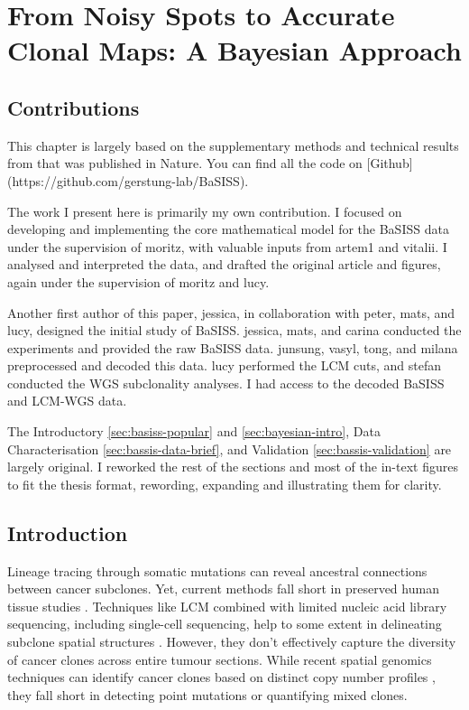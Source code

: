 \chapter{From Noisy Spots to Accurate Clonal Maps: A Bayesian Approach}

\section*{Contributions}
This chapter is largely based on the supplementary methods and technical results from \textcite{Lomakin2022-rw} that was published in Nature. You can find all the code on [Github](https://github.com/gerstung-lab/BaSISS).

The work I present here is primarily my own contribution. I focused on developing and implementing the core mathematical model for the \acs{BaSISS} data under the supervision of \ac{moritz}, with valuable inputs from \ac{artem1} and \ac{vitalii}. I analysed and interpreted the data, and drafted the original article and figures, again under the supervision of \ac{moritz} and \ac{lucy}.

Another first author of this paper, \ac{jessica}, in collaboration with \ac{peter}, \ac{mats}, and \ac{lucy}, designed the initial study of \acs{BaSISS}. \ac{jessica}, \ac{mats}, and \ac{carina} conducted the experiments and provided the raw \acs{BaSISS} data. \ac{junsung}, \ac{vasyl}, \ac{tong}, and \ac{milana} preprocessed and decoded this data. \ac{lucy} performed the \acs{LCM} cuts, and \ac{stefan} conducted the \acs{WGS} subclonality analyses. I had access to the decoded \acs{BaSISS} and \acs{LCM}-\acs{WGS} data.

The Introductory \cref{sec:basiss-popular} and \cref{sec:bayesian-intro}, Data Characterisation \cref{sec:bassis-data-brief}, and Validation \cref{sec:bassis-validation} are largely original. I reworked the rest of the sections and most of the in-text figures to fit the thesis format, rewording, expanding and illustrating them for clarity.

\section{Introduction}
\label{sec:basiss-intro}
Lineage tracing through somatic mutations can reveal ancestral connections between cancer subclones. Yet, current methods fall short in preserved human tissue studies \parencite{Yates2015-eg,Jamal-Hanjani2017-ed,Jones2008-tg,Shah2009-lx,Casasent2018-gx,Tarabichi2021-xx}. Techniques like \acf{LCM} combined with limited nucleic acid library sequencing, including single-cell sequencing, help to some extent in delineating subclone spatial structures \parencite{Shen2000-xj,Casasent2018-gx}. However, they don't effectively capture the diversity of cancer clones across entire tumour sections. While recent spatial genomics techniques can identify cancer clones based on distinct copy number profiles \parencite{Zhao2022-dp,Erickson2022-mq}, they fall short in detecting point mutations or quantifying mixed clones.

